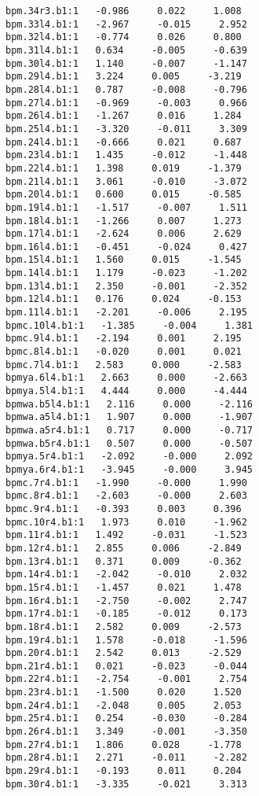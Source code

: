 \begin{verbatim}
bpm.34r3.b1:1   -0.986     0.022     1.008
bpm.33l4.b1:1   -2.967     -0.015     2.952
bpm.32l4.b1:1   -0.774     0.026     0.800
bpm.31l4.b1:1   0.634     -0.005     -0.639
bpm.30l4.b1:1   1.140     -0.007     -1.147
bpm.29l4.b1:1   3.224     0.005     -3.219
bpm.28l4.b1:1   0.787     -0.008     -0.796
bpm.27l4.b1:1   -0.969     -0.003     0.966
bpm.26l4.b1:1   -1.267     0.016     1.284
bpm.25l4.b1:1   -3.320     -0.011     3.309
bpm.24l4.b1:1   -0.666     0.021     0.687
bpm.23l4.b1:1   1.435     -0.012     -1.448
bpm.22l4.b1:1   1.398     0.019     -1.379
bpm.21l4.b1:1   3.061     -0.010     -3.072
bpm.20l4.b1:1   0.600     0.015     -0.585
bpm.19l4.b1:1   -1.517     -0.007     1.511
bpm.18l4.b1:1   -1.266     0.007     1.273
bpm.17l4.b1:1   -2.624     0.006     2.629
bpm.16l4.b1:1   -0.451     -0.024     0.427
bpm.15l4.b1:1   1.560     0.015     -1.545
bpm.14l4.b1:1   1.179     -0.023     -1.202
bpm.13l4.b1:1   2.350     -0.001     -2.352
bpm.12l4.b1:1   0.176     0.024     -0.153
bpm.11l4.b1:1   -2.201     -0.006     2.195
bpmc.10l4.b1:1   -1.385     -0.004     1.381
bpmc.9l4.b1:1   -2.194     0.001     2.195
bpmc.8l4.b1:1   -0.020     0.001     0.021
bpmc.7l4.b1:1   2.583     0.000     -2.583
bpmya.6l4.b1:1   2.663     0.000     -2.663
bpmya.5l4.b1:1   4.444     0.000     -4.444
bpmwa.b5l4.b1:1   2.116     0.000     -2.116
bpmwa.a5l4.b1:1   1.907     0.000     -1.907
bpmwa.a5r4.b1:1   0.717     0.000     -0.717
bpmwa.b5r4.b1:1   0.507     0.000     -0.507
bpmya.5r4.b1:1   -2.092     -0.000     2.092
bpmya.6r4.b1:1   -3.945     -0.000     3.945
bpmc.7r4.b1:1   -1.990     -0.000     1.990
bpmc.8r4.b1:1   -2.603     -0.000     2.603
bpmc.9r4.b1:1   -0.393     0.003     0.396
bpmc.10r4.b1:1   1.973     0.010     -1.962
bpm.11r4.b1:1   1.492     -0.031     -1.523
bpm.12r4.b1:1   2.855     0.006     -2.849
bpm.13r4.b1:1   0.371     0.009     -0.362
bpm.14r4.b1:1   -2.042     -0.010     2.032
bpm.15r4.b1:1   -1.457     0.021     1.478
bpm.16r4.b1:1   -2.750     -0.002     2.747
bpm.17r4.b1:1   -0.185     -0.012     0.173
bpm.18r4.b1:1   2.582     0.009     -2.573
bpm.19r4.b1:1   1.578     -0.018     -1.596
bpm.20r4.b1:1   2.542     0.013     -2.529
bpm.21r4.b1:1   0.021     -0.023     -0.044
bpm.22r4.b1:1   -2.754     -0.001     2.754
bpm.23r4.b1:1   -1.500     0.020     1.520
bpm.24r4.b1:1   -2.048     0.005     2.053
bpm.25r4.b1:1   0.254     -0.030     -0.284
bpm.26r4.b1:1   3.349     -0.001     -3.350
bpm.27r4.b1:1   1.806     0.028     -1.778
bpm.28r4.b1:1   2.271     -0.011     -2.282
bpm.29r4.b1:1   -0.193     0.011     0.204
bpm.30r4.b1:1   -3.335     -0.021     3.313

\end{verbatim}
